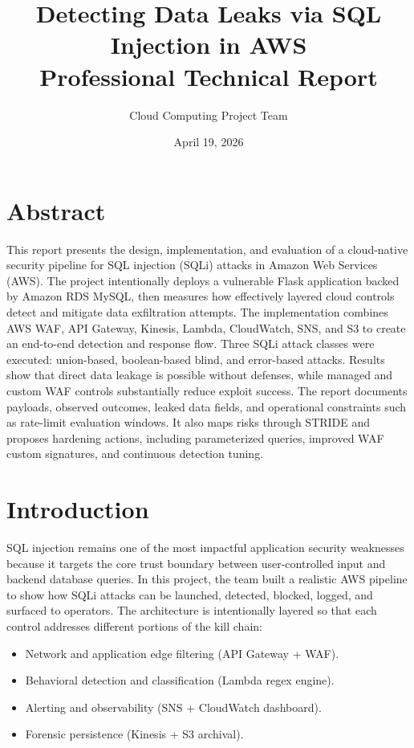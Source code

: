\documentclass[12pt,a4paper]{article}
\title{Detecting Data Leaks via SQL Injection in AWS\\[0.25em]
\large Professional Technical Report}
\author{Cloud Computing Project Team}
\date{April 19, 2026}
\begin{document}
\maketitle
\tableofcontents
\newpage

\section{Abstract}
This report presents the design, implementation, and evaluation of a cloud-native security pipeline for SQL injection (SQLi) attacks in Amazon Web Services (AWS). The project intentionally deploys a vulnerable Flask application backed by Amazon RDS MySQL, then measures how effectively layered cloud controls detect and mitigate data exfiltration attempts. The implementation combines AWS WAF, API Gateway, Kinesis, Lambda, CloudWatch, SNS, and S3 to create an end-to-end detection and response flow. Three SQLi attack classes were executed: union-based, boolean-based blind, and error-based attacks. Results show that direct data leakage is possible without defenses, while managed and custom WAF controls substantially reduce exploit success. The report documents payloads, observed outcomes, leaked data fields, and operational constraints such as rate-limit evaluation windows. It also maps risks through STRIDE and proposes hardening actions, including parameterized queries, improved WAF custom signatures, and continuous detection tuning.

\section{Introduction}
SQL injection remains one of the most impactful application security weaknesses because it targets the core trust boundary between user-controlled input and backend database queries. In this project, the team built a realistic AWS pipeline to show how SQLi attacks can be launched, detected, blocked, logged, and surfaced to operators. The architecture is intentionally layered so that each control addresses different portions of the kill chain:
\begin{itemize}
  \item Network and application edge filtering (API Gateway + WAF).
  \item Behavioral detection and classification (Lambda regex engine).
  \item Alerting and observability (SNS + CloudWatch dashboard).
  \item Forensic persistence (Kinesis + S3 archival).
\end{itemize}
\end{document}
